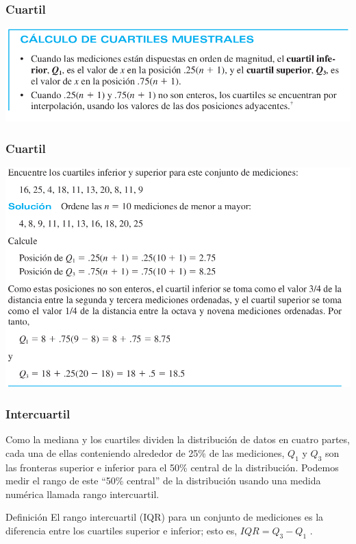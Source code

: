 \documentclass[spanish]{beamer}
\begin{document}
\begin{frame}
\frametitle{Cuartil}

\begin{center}
\includegraphics[width=\textwidth]{im27}
\end{center}


\end{frame}
\begin{frame}
\frametitle{Cuartil}

\begin{center}
\includegraphics[width=\textwidth]{im28}
\end{center}


\end{frame}
\begin{frame}
\frametitle{Intercuartil}
Como la mediana y los cuartiles dividen la distribución de datos en cuatro partes, cada una de ellas conteniendo alrededor de 25\% de las mediciones, $Q_1$ y $Q_3$ son las fronteras superior e inferior para el 50\% central de la distribución. Podemos medir el rango de este “50\% central” de la distribución usando una medida numérica llamada rango intercuartil.

\begin{block}{Definición}
El rango intercuartil (IQR) para un conjunto de mediciones es la diferencia entre los cuartiles superior e inferior; esto es, $IQR = Q_3 - Q_1$ .
\end{block}
\end{frame}
\end{document}
